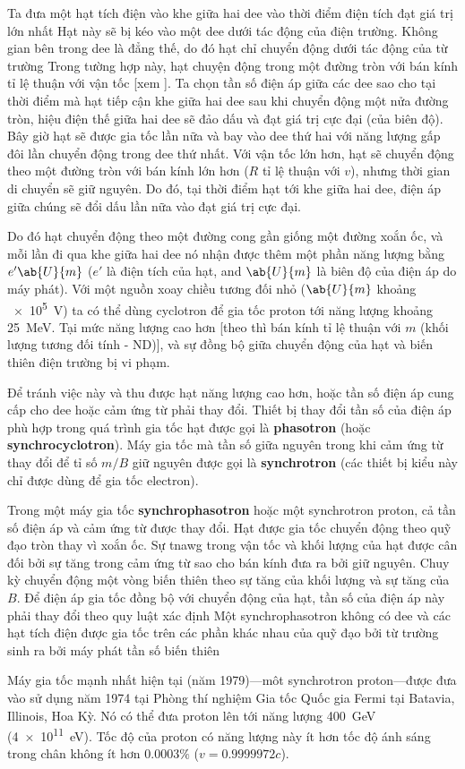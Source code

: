 Ta đưa một hạt tích điện vào khe giữa hai dee vào thời điểm điện tích đạt giá trị lớn nhất
Hạt này sẽ bị kéo vào một dee dưới tác động của điện trường.
Không gian bên trong dee là đẳng thế, do đó hạt chỉ chuyển động dưới tác động của từ trường
Trong tường hợp này, hạt chuyện động trong một đường tròn với bán kính tỉ lệ thuận với vận tốc [xem ].
Ta chọn tần số điện áp giữa các dee sao cho tại thời điểm mà hạt tiếp cận khe giữa hai dee sau khi chuyển động một nửa đường tròn, hiệu điện thế giữa hai dee sẽ đảo dấu và đạt giá trị cực đại (của biên độ).
Bây giờ hạt sẽ được gia tốc lần nữa và bay vào dee thứ hai với năng lượng gấp đôi lần chuyển động trong dee thứ nhất.
Với vận tốc lớn hơn, hạt sẽ chuyển động theo một đường tròn với bán kính lớn hơn ($R$ tỉ lệ thuận với $v$), nhưng thời gian di chuyển sẽ giữ nguyên.
Do đó, tại thời điểm hạt tới khe giữa hai dee, điện áp giữa chúng sẽ đổi dấu lần nữa vào đạt giá trị cực đại.

Do đó hạt chuyển động theo một đường cong gần giống một đường xoắn ốc, và mỗi lần đi qua khe giữa hai dee nó nhận được thêm một phần năng lượng bằng $e'\ab{U}{m}$ ($e'$ là điện tích của hạt, and $\ab{U}{m}$ là biên độ của điện áp do máy phát).
Với một nguồn xoay chiều tương đối nhỏ ($\ab{U}{m}$ khoảng \SI{e5}{\volt}) ta có thể dùng cyclotron để gia tốc proton tới năng lượng khoảng \SI{25}{\mega\electronvolt}.
Tại mức năng lượng cao hơn [theo  thì bán kính tỉ lệ thuận với $m$ (khối lượng tương đối tính - ND)], và sự đồng bộ giữa chuyển động của hạt và biến thiên điện trường bị vi phạm.

Để tránh việc này và thu được hạt năng lượng cao hơn, hoặc tần số điện áp cung cấp cho dee hoặc cảm ứng từ phải thay đổi.
Thiết bị thay đổi tần số của điện áp phù hợp trong quá trình gia tốc hạt được gọi là \textbf{phasotron} (hoặc \textbf{synchrocyclotron}).
Máy gia tốc mà tần số giữa nguyên trong khi cảm ứng từ thay đổi để tỉ số $m/B$ giữ nguyên được gọi là \textbf{synchrotron} (các thiết bị kiểu này chỉ được dùng để gia tốc electron).

Trong một máy gia tốc \textbf{synchrophasotron} hoặc một synchrotron proton, cả tần số điện áp và cảm ứng từ được thay đổi.
Hạt được gia tốc chuyển động theo quỹ đạo tròn thay vì xoắn ốc.
Sự tnawg trong vận tốc và khối lượng của hạt được cân đối bởi sự tăng trong cảm ứng từ sao cho bán kính đưa ra bởi  giữ nguyên.
Chuy kỳ chuyển động một vòng biến thiên theo sự tăng của khối lượng và sự tăng của  $B$.
Để điện áp gia tốc đồng bộ với chuyển động của hạt, tần số của điện áp này phải thay đổi theo quy luật xác định
Một synchrophasotron không có dee và các hạt tích điện được gia tốc trên các phần khác nhau của quỹ đạo bởi từ trường sinh ra bởi máy phát tần số biến thiên

Máy gia tốc mạnh nhất hiện tại (năm 1979)---môt synchrotron proton---được đưa vào sử dụng năm 1974 tại Phòng thí nghiệm Gia tốc Quốc gia Fermi tại Batavia, Illinois, Hoa Kỳ.
Nó có thể đưa proton lên tới năng lượng \SI{400}{\giga\electronvolt} (\SI{4e11}{\electronvolt}).
Tốc độ của proton có năng lượng này ít hơn tốc độ ánh sáng trong chân không ít hơn $0.0003\%$ ($v = 0.9999972c$).
